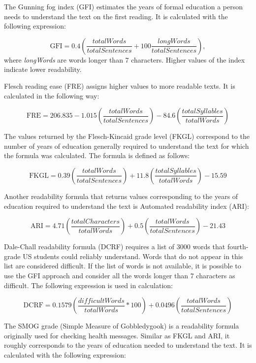 \documentclass{clv3}
\begin{document}
The Gunning fog index \citep{gunning1952technique} (GFI) estimates the years of formal education a person needs to understand the text on the first reading. It is calculated with the following expression:

\[ \textrm{GFI} = 0.4(\frac{totalWords} {totalSentences} + 100\frac{longWords} {totalSentences}), \] where \textit{longWords} are words longer than 7 characters. Higher values of the index indicate lower readability. 

Flesch reading ease \citep{kincaid1975derivation} (FRE) assigns higher values to more readable texts. It is calculated in the following way:

\[ \textrm{FRE} = 206.835 - 1.015 (\frac{totalWords} {totalSentences}) - 84.6 (\frac{totalSyllables} {totalWords}) \]

The values returned by the Flesch-Kincaid grade level \citep{kincaid1975derivation} (FKGL) correspond to the number of years of education generally required to understand the text for which the formula was calculated. The formula is defined as follows:

\[ \textrm{FKGL} = 0.39 (\frac{totalWords} {totalSentences}) + 11.8 (\frac{totalSyllables} {totalWords}) - 15.59 \]

Another readability formula that returns values corresponding to the years of education required to understand the text is Automated readability index \citep{smith1967automated} (ARI): 

\[\textrm{ARI}  = 4.71 (\frac{totalCharacters} {totalWords}) + 0.5 (\frac{totalWords} {totalSentences}) - 21.43 \]

Dale-Chall readability formula \citep{dale1948formula} (DCRF) requires a list of \num{3000} words that fourth-grade US students could reliably understand. Words that do not appear in this list are considered difficult. If the list of words is not available, it is possible to use the GFI approach and consider all the words longer than 7 characters as difficult. The following expression is used in calculation:  

\[\textrm{DCRF}  = 0.1579 (\frac{\textit{difficultWords}} {totalWords} * 100) + 0.0496 (\frac{totalWords} {totalSentences}) \]

The SMOG grade (Simple Measure of Gobbledygook) \cite{mc1969smog} is a readability formula originally used for checking health messages. Similar as FKGL and ARI, it roughly corresponds to the years of education needed to understand the text. It is calculated with the following expression: 
\end{document}
